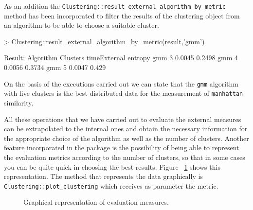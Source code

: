 As an addition the \texttt{Clustering::result\_external\_algorithm\_by\_metric} method has been incorporated to filter the results of the clustering object from an algorithm to be able to choose a suitable cluster.

\begin{Schunk}
\begin{Sinput}
> Clustering::result_external_algorithm_by_metric(result,'gmm')
\end{Sinput}
\begin{Soutput}
Result:
Algorithm Clusters timeExternal entropy
    gmm      3       0.0045      0.2498
    gmm      4       0.0056      0.3734
    gmm      5       0.0047      0.429
\end{Soutput}
\end{Schunk}

On the basis of the executions carried out we can state that the \texttt{gmm} algorithm with five clusters is the best distributed data for the measurement of \texttt{manhattan} similarity.

All these operations that we have carried out to evaluate the external measures can be extrapolated to the internal ones and obtain the necessary information for the appropriate choice of the algorithm as well as the number of clusters. Another feature incorporated in the package is the possibility of being able to represent the evaluation metrics according to the number of clusters, so that in some cases you can be quite quick in choosing the best results. Figure ~\ref{fig:clustering} shows this representation. The method that represents the data graphically is \texttt{Clustering::plot\_clustering} which receives as parameter the metric.

\begin{figure}[htbp]
  \centering
    \qquad
    \caption{Graphical representation of evaluation measures.}%
    \label{fig:clustering}%
\end{figure}

